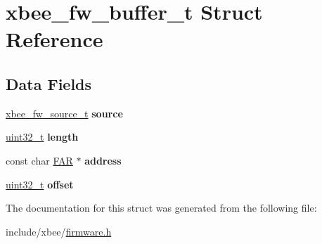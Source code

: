 \hypertarget{structxbee__fw__buffer__t}{}\section{xbee\+\_\+fw\+\_\+buffer\+\_\+t Struct Reference}
\label{structxbee__fw__buffer__t}
\subsection*{Data Fields}
\begin{DoxyCompactItemize}
\item 
\hyperlink{structxbee__fw__source__t}{xbee\+\_\+fw\+\_\+source\+\_\+t} {\bfseries source}
\item 
\hyperlink{group__hal__dos_ga09a1e304d66d35dd47daffee9731edaa}{uint32\+\_\+t} {\bfseries length}
\item 
const char \hyperlink{group__hal_gaef060b3456fdcc093a7210a762d5f2ed}{F\+AR} $\ast$ {\bfseries address}
\item 
\hyperlink{group__hal__dos_ga09a1e304d66d35dd47daffee9731edaa}{uint32\+\_\+t} {\bfseries offset}
\end{DoxyCompactItemize}


The documentation for this struct was generated from the following file\+:\begin{DoxyCompactItemize}
\item 
include/xbee/\hyperlink{firmware_8h}{firmware.\+h}\end{DoxyCompactItemize}
